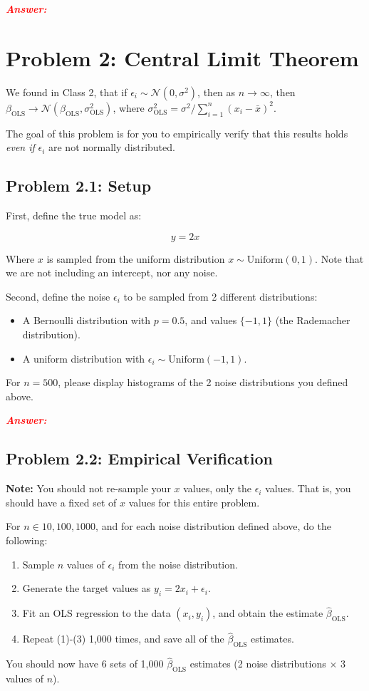 \documentclass[11pt, letterpaper]{article}
\newcommand{\problem}[1]{\section*{Problem #1}}
\newcommand{\subproblem}[1]{\subsection*{Problem #1}}
\newcommand{\answer}{\textbf{\textit{\textcolor{red}{Answer:}}}\\}
\begin{document}
\answer


\problem{2: Central Limit Theorem}

We found in Class 2, that if $\epsilon_i \sim \mathcal{N}(0, \sigma^2)$,
then as $n \to \infty$, then $\beta_{\text{OLS}} \to \mathcal{N}(\beta_{\text{OLS}}, \sigma_{\text{OLS}}^2)$, where $\sigma_{\text{OLS}}^2 = \sigma^2 / \sum_{i=1}^n (x_i - \bar{x})^2$.

The goal of this problem is for you to empirically verify that this 
results holds \textit{even if} $\epsilon_i$ are not normally distributed.

\subproblem{2.1: Setup}

First, define the true model as:

$$
y = 2x
$$

Where $x$ is sampled from the uniform distribution $x \sim \text{Uniform}(0, 1)$.
Note that we are not including an intercept, nor any noise.

Second, define the noise $\epsilon_i$ to be sampled from 2 different distributions:
\begin{itemize}
    \item A Bernoulli distribution with $p=0.5$, and values $\{-1, 1\}$ (the Rademacher distribution).
    \item A uniform distribution with $\epsilon_i \sim \text{Uniform}(-1, 1)$.
\end{itemize}

For $n=500$, please display histograms of the 2 noise distributions you defined above.

\answer

\subproblem{2.2: Empirical Verification}

\textbf{Note:} You should not re-sample your $x$ values, only the $\epsilon_i$ values.
That is, you should have a fixed set of $x$ values for this entire problem.

For $n \in {10, 100, 1000}$, and for each noise distribution defined above, do the following:
\begin{enumerate}
    \item Sample $n$ values of $\epsilon_i$ from the noise distribution.
    \item Generate the target values as $y_i = 2x_i + \epsilon_i$.
    \item Fit an OLS regression to the data $(x_i, y_i)$, and obtain the estimate $\hat{\beta}_{\text{OLS}}$.
    \item Repeat (1)-(3) 1,000 times, and save all of the $\hat{\beta}_{\text{OLS}}$ estimates.
\end{enumerate}
You should now have 6 sets of 1,000 $\hat{\beta}_{\text{OLS}}$ estimates (2 noise distributions $\times$ 3 values of $n$).
\end{document}
